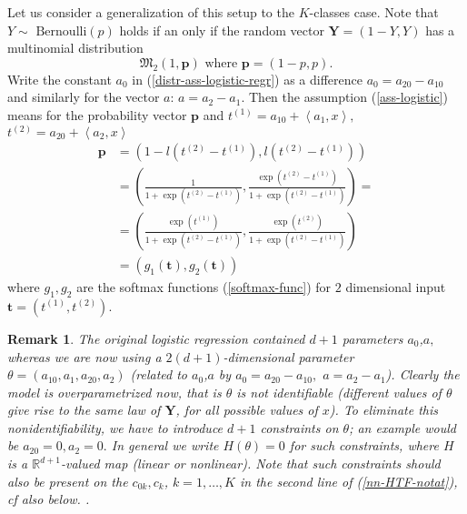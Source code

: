\documentclass[11pt,twoside]{article}%
\theoremstyle{change}
\newtheorem{remark}[theorem]{Remark}
\begin{document}
Let us consider a generalization of this setup to the $K$-classes case. Note
that $Y\sim$ $\mathrm{Bernoulli}(p)$ holds if an only if the random vector
$\mathbf{Y}=(1-Y,Y)$ has a multinomial distribution
\[
\mathfrak{M}_{2}(1,\mathbf{p})\text{ where }\mathbf{p}=\left(  1-p,p\right)  .
\]
Write the constant $a_{0}$ in (\ref{distr-ass-logistic-regr}) as a difference
$a_{0}=a_{20}-a_{10}$ and similarly for the vector $a$: $a=a_{2}-a_{1}$. Then
the assumption (\ref{ass-logistic}) means for the probability vector
$\mathbf{p}$ and $t^{(1)}=a_{10}+\left\langle a_{1},x\right\rangle ,$
$t^{(2)}=a_{20}+\left\langle a_{2},x\right\rangle $
\begin{align*}
\mathbf{p}  & \mathbf{=}\left(  1-l(t^{(2)}-t^{(1)}),l(t^{(2)}-t^{(1)})\right)
\\
& =\left(  \frac{1}{1+\exp(t^{(2)}-t^{(1)})},\frac{\exp(t^{(2)}-t^{(1)}%
)}{1+\exp(t^{(2)}-t^{(1)})}\right)  =\\
& =\left(  \frac{\exp(t^{(1)})}{1+\exp(t^{(2)}-t^{(1)})},\frac{\exp(t^{(2)}%
)}{1+\exp(t^{(2)}-t^{(1)})}\right) \\
& =\left(  g_{1}(\mathbf{t}),g_{2}(\mathbf{t})\right)
\end{align*}
where $g_{1},g_{2}$ are the softmax functions (\ref{softmax-func}) for $2$
dimensional input $\mathbf{t}=(t^{(1)},t^{(2)})$.

\begin{remark}
\label{rem-constraints-NN}The original logistic regression contained $d+1$
parameters $a_{0}$,$a,$ whereas we are now using a $2(d+1)$-dimensional
parameter $\theta=\left(  a_{10},a_{1},a_{20},a_{2}\right)  $ (related to
$a_{0}$,$a$ by $a_{0}=a_{20}-a_{10},$ $a=a_{2}-a_{1}$). Clearly the model is
overparametrized now, that is $\theta$ is not identifiable (different values
of $\theta$ give rise to the same law of $\mathbf{Y}$, for all possible values
of $x$). To eliminate this nonidentifiability, we have to introduce $d+1$
constraints on $\theta$; an example would be $a_{20}=0,a_{2}=0.$ In general we
write $H(\theta)=0$ for such constraints, where $H$ is a $\mathbb{R}^{d+1}%
$-valued map (linear or nonlinear). Note that such constraints should also be
present on the $c_{0k},c_{k}$, $k=1,\ldots,K$ in the second line of
(\ref{nn-HTF-notat}), cf also below. .
\end{remark}
\end{document}
